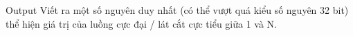 Output
Viết ra một số nguyên duy nhất (có thể vượt quá kiểu số nguyên 32 bit) thể hiện giá trị của luồng cực đại / lát cắt cực tiểu giữa 1 và N.